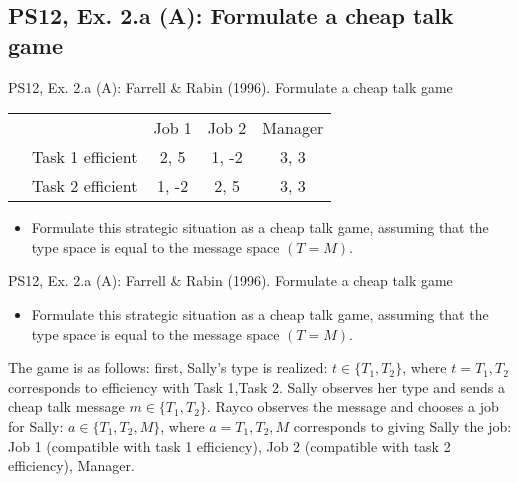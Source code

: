 \subsection{PS12, Ex. 2.a (A): Formulate a cheap talk game}

\begin{frame}{PS12, Ex. 2.a (A): Farrell \& Rabin (1996). Formulate a cheap talk game}
    \begin{table}
      \begin{tabular}{ll|c|c|c|}
          & \multicolumn{1}{c}{} & \multicolumn{1}{c}{Job 1} & \multicolumn{1}{c}{Job 2} & \multicolumn{1}{c}{Manager} \\\cline{3-5}
          \parbox[t]{20mm}{}
           & Task 1 efficient & 2, 5 & 1, -2 & 3, 3 \\
           & Task 2 efficient & 1, -2 & 2, 5 & 3, 3 \\
      \end{tabular}
    \end{table}\vspace{-12pt}
    \begin{itemize}
      \item[(a)] Formulate this strategic situation as a cheap talk game, assuming that the type space is equal to the message space $(T = M)$.
    \end{itemize}\vspace{-6pt}
    \begin{multicols}{2}
      \vfill\null\columnbreak
      \vfill\null
    \end{multicols}
\end{frame}

\begin{frame}{PS12, Ex. 2.a (A): Farrell \& Rabin (1996). Formulate a cheap talk game}
    \begin{itemize}
      \item[(a)] Formulate this strategic situation as a cheap talk game, assuming that the type space is equal to the message space $(T = M)$.
    \end{itemize}\vspace{-6pt}
    The game is as follows: first, Sally's type is realized: $t\in\{T_1,T_2\}$, where $t=T_1,T_2$ corresponds to efficiency with Task 1,Task 2. Sally observes her type and sends a cheap talk message $m\in\{T_1,T_2\}$. Rayco observes the message and chooses a job for Sally: $a\in\{T_1,T_2,M\}$, where $a=T_1,T_2,M$ corresponds to giving Sally the job: Job 1 (compatible with task 1 efficiency), Job 2 (compatible with task 2 efficiency), Manager.\vspace{-14pt}
\end{frame}



